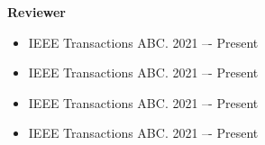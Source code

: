 \normalsize{\textbf{Reviewer}}
\begin{itemize}[leftmargin=*,nosep]
\item IEEE Transactions ABC.	\hfill				2021 –- Present
\item IEEE Transactions ABC.	\hfill				2021 –- Present
\item IEEE Transactions ABC.	\hfill				2021 –- Present
\item IEEE Transactions ABC.	\hfill				2021 –- Present
\end{itemize}
